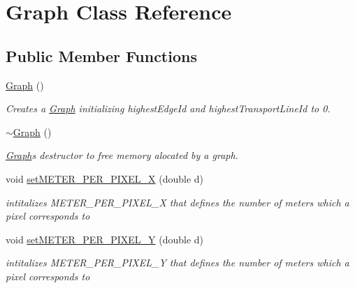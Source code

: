 \hypertarget{class_graph}{}\section{Graph Class Reference}
\label{class_graph}
\subsection*{Public Member Functions}
\begin{DoxyCompactItemize}
\item 
\mbox{\label{class_graph_ae4c72b8ac4d693c49800a4c7e273654f}} 
\hyperlink{class_graph_ae4c72b8ac4d693c49800a4c7e273654f}{Graph} ()
\begin{DoxyCompactList}\small\item\em Creates a \hyperlink{class_graph}{Graph} initializing highest\+Edge\+Id and highest\+Transport\+Line\+Id to 0. \end{DoxyCompactList}\item 
\mbox{\label{class_graph_a902c5b3eacb66d60752525ab23297a95}} 
\hyperlink{class_graph_a902c5b3eacb66d60752525ab23297a95}{$\sim$\+Graph} ()
\begin{DoxyCompactList}\small\item\em \hyperlink{class_graph}{Graph}\textquotesingle{}s destructor to free memory alocated by a graph. \end{DoxyCompactList}\item 
void \hyperlink{class_graph_a4e0ee1d777ad38c4664ce9ee3da550a4}{set\+M\+E\+T\+E\+R\+\_\+\+P\+E\+R\+\_\+\+P\+I\+X\+E\+L\+\_\+X} (double d)
\begin{DoxyCompactList}\small\item\em intitalizes M\+E\+T\+E\+R\+\_\+\+P\+E\+R\+\_\+\+P\+I\+X\+E\+L\+\_\+X that defines the number of meters which a pixel corresponds to \end{DoxyCompactList}\item 
void \hyperlink{class_graph_a50555f842e74cb9983db26cfff9bff19}{set\+M\+E\+T\+E\+R\+\_\+\+P\+E\+R\+\_\+\+P\+I\+X\+E\+L\+\_\+Y} (double d)
\begin{DoxyCompactList}\small\item\em intitalizes M\+E\+T\+E\+R\+\_\+\+P\+E\+R\+\_\+\+P\+I\+X\+E\+L\+\_\+Y that defines the number of meters which a pixel corresponds to \end{DoxyCompactList}\item 

\end{DoxyCompactItemize}
